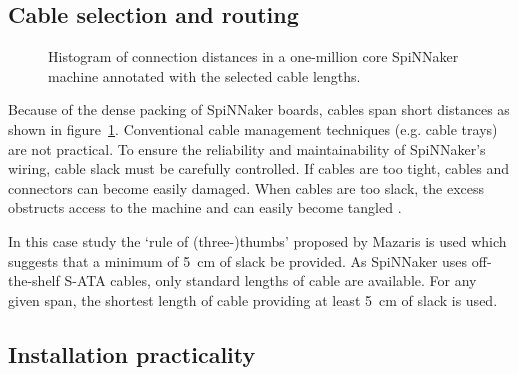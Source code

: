 		\subsection{Cable selection and routing}
			
			\begin{figure}
				
				\center
				
				\caption{Histogram of connection distances in a one-million core
				SpiNNaker machine annotated with the selected cable lengths.}
				\label{fig:wire-length-histogram}
				
			\end{figure}
			
			Because of the dense packing of SpiNNaker boards, cables span short
			distances as shown in figure~\ref{fig:wire-length-histogram}.
			Conventional cable management techniques (e.g. cable trays) are not
			practical. To ensure the reliability and maintainability of SpiNNaker's
			wiring, cable slack must be carefully controlled.  If cables are too
			tight, cables and connectors can become easily damaged.  When cables are
			too slack, the excess obstructs access to the machine and can easily
			become tangled \cite{cisco07}.
			
			In this case study the `rule of (three-)thumbs' proposed by Mazaris
			\cite{mazaris97} is used which suggests that a minimum of
			\SI{5}{\centi\meter} of slack be provided. As SpiNNaker uses
			off-the-shelf S-ATA cables, only standard lengths of cable are available.
			For any given span, the shortest length of cable providing at least
			\SI{5}{\centi\meter} of slack is used.
		
		\subsection{Installation practicality}
			
